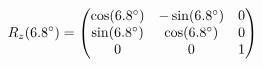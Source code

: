 \documentclass[preview]{standalone}
\begin{document}
\begin{align*}
\special{dvisvgm:raw <g id='unique000'>}R_z(6.8^\circ) = \begin{pmatrix} \cos(6.8^\circ) & -\sin(6.8^\circ) & 0 \\ \sin(6.8^\circ) & \cos(6.8^\circ) & 0 \\ 0 & 0 & 1 \end{pmatrix}\special{dvisvgm:raw </g>}
\end{align*}
\end{document}
